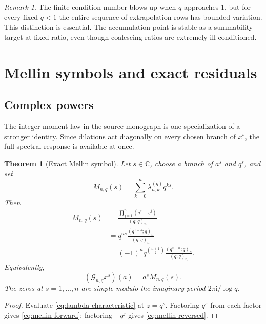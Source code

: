 \documentclass[11pt,a4paper,oneside]{article}
\newtheorem{theorem}{Theorem}[section]
\theoremstyle{definition}
\theoremstyle{remark}
\newtheorem{remark}[remark]{Remark}
\newcommand{\C}{\mathbb C}
\newcommand{\ii}{\mathrm i}
\newcommand{\Gop}{\mathcal G}
\begin{document}
\begin{remark}
The finite condition number blows up when $q$ approaches $1$, but for every
fixed $q<1$ the entire sequence of extrapolation rows has bounded variation.
This distinction is essential.  The accumulation point is stable as a
summability target at fixed ratio, even though coalescing ratios are extremely
ill-conditioned.
\end{remark}

\section{Mellin symbols and exact residuals}
\label{sec:mellin}

\subsection{Complex powers}

The integer moment law in the source monograph is one specialization of a
stronger identity.  Since dilations act diagonally on every chosen branch of
$x^s$, the full spectral response is available at once.

\begin{theorem}[Exact Mellin symbol]
\label{thm:mellin-symbol}
Let $s\in\C$, choose a branch of $a^s$ and $q^s$, and set
\begin{equation}
 M_{n,q}(s)=\sum_{k=0}^n\lambda_{n,k}^{(q)}q^{ks}.
 \label{eq:mellin-symbol-definition}
\end{equation}
Then
\begin{align}
 M_{n,q}(s)
 &=\frac{\prod_{j=1}^n(q^s-q^j)}{(q;q)_n}
 \label{eq:mellin-product}\\
 &=q^{ns}\frac{(q^{1-s};q)_n}{(q;q)_n}
 \label{eq:mellin-forward}\\
 &=(-1)^nq^{\binom{n+1}{2}}
   \frac{(q^{s-n};q)_n}{(q;q)_n}.
 \label{eq:mellin-reversed}
\end{align}
Equivalently,
\begin{equation}
 (\Gop_{n,q}x^s)(a)=a^sM_{n,q}(s).
 \label{eq:mellin-eigenvalue}
\end{equation}
The zeros at $s=1,\ldots,n$ are simple modulo the imaginary period
$2\pi\ii/\log q$.
\end{theorem}

\begin{proof}
Evaluate \eqref{eq:lambda-characteristic} at $z=q^s$.  Factoring $q^s$ from
each factor gives \eqref{eq:mellin-forward}; factoring $-q^j$ gives
\eqref{eq:mellin-reversed}.
\end{proof}
\end{document}
